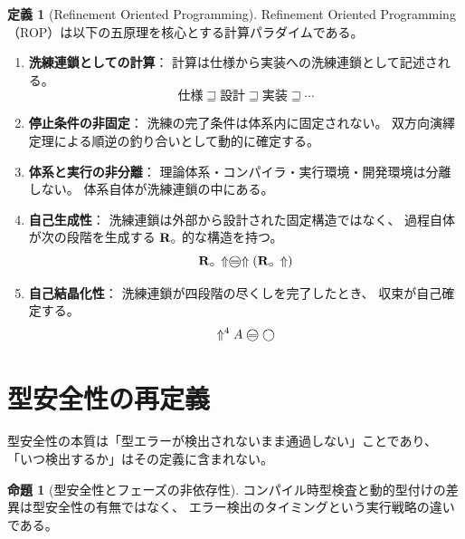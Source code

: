 \documentclass[11pt,a4paper]{ltjsarticle}
\theoremstyle{definition}
\newtheorem{definition}{定義}[section]
\newtheorem{proposition}{命題}[section]
\begin{document}
\begin{definition}[Refinement Oriented Programming]
Refinement Oriented Programming（ROP）は以下の五原理を核心とする計算パラダイムである。

\begin{enumerate}
  \item \textbf{洗練連鎖としての計算}：
    計算は仕様から実装への洗練連鎖として記述される。
    \begin{equation}
      \text{仕様} \sqsupseteq \text{設計} \sqsupseteq \text{実装} \sqsupseteq \cdots
    \end{equation}
  
  \item \textbf{停止条件の非固定}：
    洗練の完了条件は体系内に固定されない。
    双方向演繹定理による順逆の釣り合いとして動的に確定する。
  
  \item \textbf{体系と実行の非分離}：
    理論体系・コンパイラ・実行環境・開発環境は分離しない。
    体系自体が洗練連鎖の中にある。
  
  \item \textbf{自己生成性}：
    洗練連鎖は外部から設計された固定構造ではなく、
    過程自体が次の段階を生成する $\mathbf{R}_{\circ}$ 的な構造を持つ。
    \begin{equation}
      \Rmw\,\metanegation \mweq \metanegation(\Rmw\,\metanegation)
    \end{equation}
  
  \item \textbf{自己結晶化性}：
    洗練連鎖が四段階の尽くしを完了したとき、
    収束が自己確定する。
    \begin{equation}
      \metanegation^4 A \mweq \dfix
    \end{equation}
\end{enumerate}
\end{definition}

\section{型安全性の再定義}

型安全性の本質は「型エラーが検出されないまま通過しない」ことであり、
「いつ検出するか」はその定義に含まれない。

\begin{proposition}[型安全性とフェーズの非依存性]
コンパイル時型検査と動的型付けの差異は型安全性の有無ではなく、
エラー検出のタイミングという実行戦略の違いである。
\end{proposition}
\end{document}
